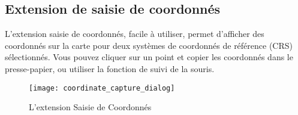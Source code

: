 \subsection{Extension de saisie de coordonn\'es}



L'extension saisie de coordonn\'es, facile \`a utiliser, permet 
d'afficher des coordonn\'es sur la carte pour deux syst\`emes de 
coordonn\'es de r\'ef\'erence (CRS) s\'electionn\'es. Vous pouvez cliquer 
sur un point et copier les coordonn\'es dans le presse-papier, ou 
utiliser la fonction de suivi de la souris.


\begin{figure}[ht]
   \begin{center}
   \caption{L'extension Saisie de Coordonn\'es \nixcaption}\label{fig:coordinate_capture_dialog}\smallskip
   \texttt{[image: coordinate\_capture\_dialog]}
\end{center}  
\end{figure}

